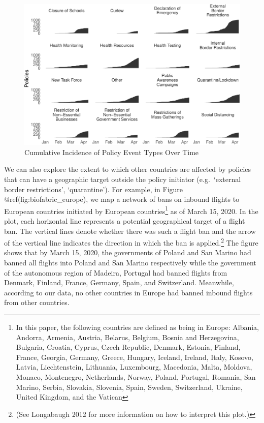 \documentclass[]{article}
\let\rmarkdownfootnote\footnote%
\def\footnote{\protect\rmarkdownfootnote}
\begin{document}
\begin{figure}
\centering
\includegraphics{corona_wp_files/figure-latex/overtime-1.pdf}
\caption{\label{fig:overtime}Cumulative Incidence of Policy Event Types Over Time}
\end{figure}

We can also explore the extent to which other countries are affected by policies that can have a geographic target outside the policy initiator (e.g.~`external border restrictions', `quarantine'). For example, in Figure @ref(fig:biofabric\_europe), we map a network of bans on inbound flights to European countries initiated by European countries\footnote{In this paper, the following countries are defined as being in Europe: Albania, Andorra, Armenia, Austria, Belarus, Belgium, Bosnia and Herzegovina, Bulgaria, Croatia, Cyprus, Czech Republic, Denmark, Estonia, Finland, France, Georgia, Germany, Greece, Hungary, Iceland, Ireland, Italy, Kosovo, Latvia, Liechtenstein, Lithuania, Luxembourg, Macedonia, Malta, Moldova, Monaco, Montenegro, Netherlands, Norway, Poland, Portugal, Romania, San Marino, Serbia, Slovakia, Slovenia, Spain, Sweden, Switzerland, Ukraine, United Kingdom, and the Vatican} as of March 15, 2020. In the plot, each horizontal line represents a potential geographical target of a flight ban. The vertical lines denote whether there was such a flight ban and the arrow of the vertical line indicates the direction in which the ban is applied.\footnote{(See Longabaugh 2012 for more information on how to interpret this plot.)} The figure shows that by March 15, 2020, the governments of Poland and San Marino had banned all flights into Poland and San Marino respectively while the government of the autonomous region of Madeira, Portugal had banned flights from Denmark, Finland, France, Germany, Spain, and Switzerland. Meanwhile, according to our data, no other countries in Europe had banned inbound flights from other countries.
\end{document}
